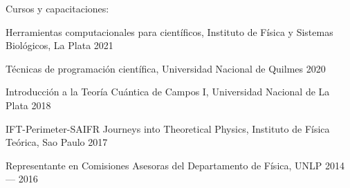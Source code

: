 Cursos y capacitaciones:
\begin{zitemize}\vspace{-0.2 cm}
\item[\empty] Herramientas computacionales para científicos, Instituto de Física y Sistemas Biológicos, La Plata \hfill 2021

\item[\empty] Técnicas de programación científica, Universidad Nacional de Quilmes \hfill 2020

\item[\empty] Introducción a la Teoría Cuántica de Campos I, Universidad Nacional de La Plata \hfill 2018

\item[\empty] IFT-Perimeter-SAIFR Journeys into Theoretical Physics, Instituto de Física Teórica, Sao Paulo \hfill 2017
\end{zitemize}
Representante en Comisiones Asesoras del Departamento de Física, UNLP \hspace{6.35 cm} 2014 --- 2016 
